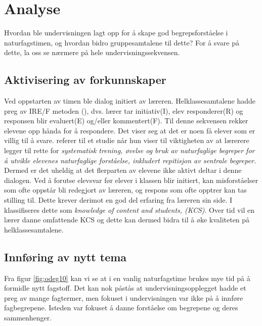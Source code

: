 \documentclass[main.tex]{subfiles}
\begin{document}
\section*{Analyse}
\label{sec:2}

Hvordan ble undervisningen lagt opp for å skape god begrepsforståelse i naturfagstimen, og hvordan 
bidro gruppesamtalene til dette? For å svare på dette, la oss se nærmere på hele 
undervisningssekvensen.
\newline
\newline
\subsection*{Aktivisering av forkunnskaper}
Ved oppstarten av timen ble dialog initiert av læreren. Helklassesamtalene hadde preg av
IRE/F metoden (), dvs. lærer tar initiativ(I), elev responderer(R) og responsen blir 
evaluert(E) og/eller kommentert(F). Til denne sekvensen rekker elevene opp hånda for å respondere. 
Det viser seg at det er noen få elever som er villig til å svare.  referer til 
et studie når hun viser til viktigheten av at lærerere legger til rette for \emph{systematisk 
trening, øvelse og bruk av naturfaglige begreper for å utvikle elevenes naturfaglige forståelse, 
inkludert repitisjon av sentrale begreper.} Dermed er det uheldig at det flerparten av elevene
ikke aktivt deltar i denne dialogen.
\newline
\newline
Ved å forutse elevsvar før elever i klassen blir initiert, kan misforståelser som 
ofte oppstår bli redegjort av læreren, og respons som ofte opptrer kan tas stilling til. Dette krever 
derimot en god del erfaring fra læreren sin side. I  klassifiseres dette som 
\emph{knowledge of content and students, (KCS)}. Over tid vil en lærer danne omfattende KCS og dette 
kan dermed bidra til å øke kvaliteten på helklassesamtalene. 

\subsection*{Innføring av nytt tema}
Fra figur \ref{fig:odeg10} kan vi se at i en vanlig naturfagstime brukes mye tid på å formidle 
nytt fagstoff. Det kan nok påstås at undervisningsopplegget hadde et preg av mange fagtermer, men 
fokuset i undervisningen var ikke på å innføre fagbegrepene. Isteden var fokuset å danne forståelse 
om begrepene og deres sammenhenger. 
\end{document}
